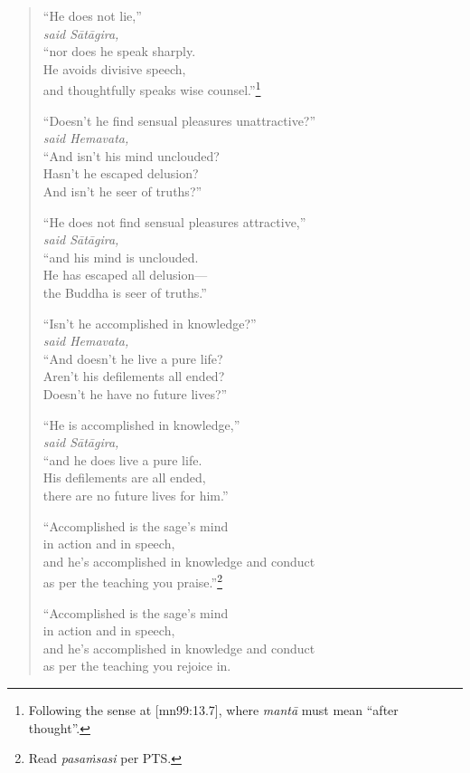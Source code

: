 \documentclass[12pt,openany]{book}%
\newcommand*{\scspeaker}[1]{\hspace{2em}\textit{#1}}
\begin{document}
\begin{verse}
“He does not lie,” \\
\scspeaker{said \textsanskrit{Sātāgira}, }\\
“nor does he speak sharply. \\
He avoids divisive speech, \\
and thoughtfully speaks wise counsel.”\footnote{Following the sense at [mn99:13.7], where \textit{\textsanskrit{mantā}} must mean “after thought”. } 

“Doesn’t he find sensual pleasures unattractive?” \\
\scspeaker{said Hemavata, }\\
“And isn’t his mind unclouded? \\
Hasn’t he escaped delusion? \\
And isn’t he seer of truths?” 

“He does not find sensual pleasures attractive,” \\
\scspeaker{said \textsanskrit{Sātāgira}, }\\
“and his mind is unclouded. \\
He has escaped all delusion—\\
the Buddha is seer of truths.” 

“Isn’t he accomplished in knowledge?” \\
\scspeaker{said Hemavata, }\\
“And doesn’t he live a pure life? \\
Aren’t his defilements all ended? \\
Doesn’t he have no future lives?” 

“He is accomplished in knowledge,” \\
\scspeaker{said \textsanskrit{Sātāgira}, }\\
“and he does live a pure life. \\
His defilements are all ended, \\
there are no future lives for him.” 

“Accomplished is the sage’s mind \\
in action and in speech, \\
and he’s accomplished in knowledge and conduct \\
as per the teaching you praise.”\footnote{Read \textit{\textsanskrit{pasaṁsasi}} per PTS. } 

“Accomplished is the sage’s mind \\
in action and in speech, \\
and he’s accomplished in knowledge and conduct \\
as per the teaching you rejoice in. 


\end{verse}
\end{document}
